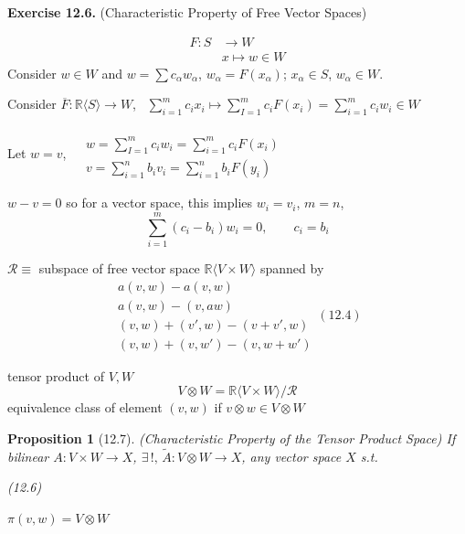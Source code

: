 \documentclass[11pt]{amsart}
\newtheorem{proposition}{Proposition}
\theoremstyle{definition}
\newcommand{\exercisehead}[1]{\medskip\noindent\textbf{Exercise #1.} }
\begin{document}
\exercisehead{12.6} (Characteristic Property of Free Vector Spaces)

\[
\begin{aligned}
  F : S & \to W \\
  & x \mapsto w \in W
\end{aligned}
\]
Consider $w\in W$ and $w = \sum c_{\alpha} w_{\alpha}$, $w_{\alpha} = F(x_{\alpha})$; $x_{\alpha} \in S$, $w_{\alpha} \in W$.

Consider $\overline{F}:\mathbb{R}\langle S \rangle \to W$, \, $\sum_{i=1}^m c_i x_i \mapsto \sum_{I=1}^m c_i F(x_i) = \sum_{i=1}^m c_i w_i \in W$

Let $w= v$, $\begin{aligned} & \quad \\ & w = \sum_{I=1}^m c_i w_i = \sum_{i=1}^m c_i F(x_i) \\ & v = \sum_{i=1}^n b_i v_i = \sum_{i=1}^n b_i F(y_i) \end{aligned}$

$w - v =0$ so for a vector space, this implies $w_i = v_i$, $m=n$,
\[
\sum_{i=1}^m (c_i-b_i)w_i = 0, \quad \quad c_i = b_i
\]

$\mathcal{R} \equiv$ subspace of free vector space $\mathbb{R}\langle V \times W \rangle $ spanned by
\begin{equation}
\begin{gathered}
  a(v,w) - a(v, w) \\
  a(v,w) - (v,aw) \\
(v,w) + (v',w) - (v+v',w) \\
  (v,w) + (v,w') - (v,w+w')
\end{gathered} (12.4)
\end{equation}

tensor product of $V, W$
\[
V\otimes W = \mathbb{R} \langle V \times W \rangle / \mathcal{R}
\]
equivalence class of element $(v,w)$ if $v\otimes w \in V\otimes W$

\begin{proposition}[12.7] (Characteristic Property of the Tensor Product Space)
  If bilinear $A: V \times W \to X$, $\exists \, !, \, \widetilde{A} : V\otimes W \to X$, any vector space $X$  s.t.
  (12.6)

$\pi(v,w) = V\otimes W$
\end{proposition}
\end{document}
